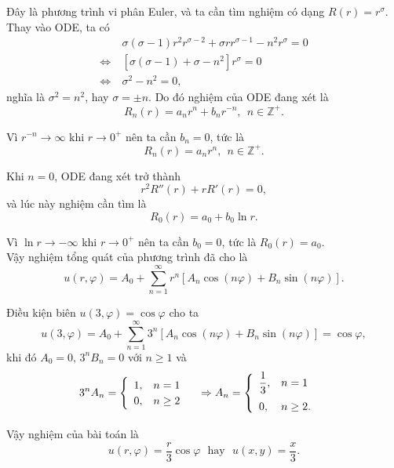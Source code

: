 \documentclass[10pt, a4paper]{article}
\begin{document}
	Đây là phương trình vi phân Euler, và ta cần tìm nghiệm có dạng $R(r)=r^\sigma$. Thay vào ODE, ta có \begin{align*}
		&\sigma(\sigma-1)r^2r^{\sigma-2}+\sigma rr^{\sigma-1}-n^2r^\sigma=0\\
		\Leftrightarrow~&[\sigma(\sigma-1)+\sigma-n^2]r^\sigma=0\\
		\Leftrightarrow~&\sigma^2-n^2=0,
	\end{align*}
	nghĩa là $\sigma^2=n^2$, hay $\sigma=\pm n$. Do đó nghiệm của ODE đang xét là $$R_n(r)=a_nr^n+b_nr^{-n},~~n\in\mathbb Z^+.$$
	
	Vì $r^{-n}\to\infty$ khi $r\to0^+$ nên ta cần $b_n=0$, tức là $$R_n(r)=a_nr^n,~~n\in\mathbb Z^+.$$
	
	Khi $n=0$, ODE đang xét trở thành $$r^2R''(r)+rR'(r)=0,$$
	và lúc này nghiệm cần tìm là $$R_0(r)=a_0+b_0\ln r.$$
	
	Vì $\ln r\to-\infty$ khi $r\to0^+$ nên ta cần $b_0=0$, tức là $R_0(r)=a_0$.\\
	
	Vậy nghiệm tổng quát của phương trình đã cho là $$u(r,\varphi)=A_0+\displaystyle\sum_{n=1}^\infty r^n[A_n\cos(n\varphi)+B_n\sin(n\varphi)].$$
	
	Điều kiện biên $u(3,\varphi)=\cos\varphi$ cho ta $$u(3,\varphi)=A_0+\displaystyle\sum_{n=1}^\infty 3^n[A_n\cos(n\varphi)+B_n\sin(n\varphi)]=\cos\varphi,$$
	khi đó $A_0=0,\,3^nB_n=0$ với $n\ge1$ và $$3^nA_n=\begin{cases}
		\begin{array}{ll}
			1, & n=1 \\
			0, & n\ge2
		\end{array}
	\end{cases}\Rightarrow A_n=\begin{cases}
		\begin{array}{ll}
			\dfrac13, & n=1 \\
			\noalign{\vskip5pt}
			0, & n\ge2.
		\end{array}
	\end{cases}$$
	
	Vậy nghiệm của bài toán là $$u(r,\varphi)=\frac r3\cos\varphi~~~\text{hay}~~~u(x,y)=\frac x3.$$
\end{document}
